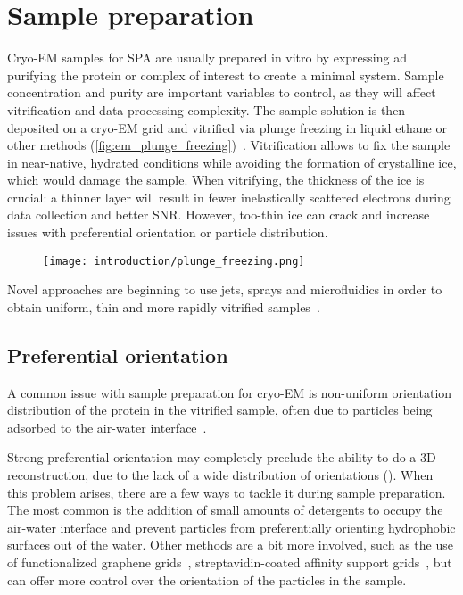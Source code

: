 \section{Sample preparation}
Cryo-EM samples for SPA are usually prepared in vitro by expressing ad purifying the protein or complex of interest to create a minimal system.
Sample concentration and purity are important variables to control, as they will affect vitrification and data processing complexity.
The sample solution is then deposited on a cryo-EM grid and vitrified via plunge freezing in liquid ethane or other methods (\autoref{fig:em_plunge_freezing})~\cite{dubochetCryoelectronMicroscopyVitrified1988}.
Vitrification allows to fix the sample in near-native, hydrated conditions while avoiding the formation of crystalline ice, which would damage the sample.
When vitrifying, the thickness of the ice is crucial: a thinner layer will result in fewer inelastically scattered electrons during data collection and better SNR.
However, too-thin ice can crack and increase issues with preferential orientation or particle distribution.

\begin{figure}[ht]
    \centering
    \texttt{[image: introduction/plunge\_freezing.png]}
    \label{fig:em_plunge_freezing}
\end{figure}

Novel approaches are beginning to use jets, sprays and microfluidics in order to obtain uniform, thin and more rapidly vitrified samples~\cite{geminEasyGridVersatilePlatform2024}.

\subsection{Preferential orientation}\label{em_pref_ori}
A common issue with sample preparation for cryo-EM is non-uniform orientation distribution of the protein in the vitrified sample, often due to particles being adsorbed to the air-water interface~\cite{nobleRoutineSingleParticle2018}.

Strong preferential orientation may completely preclude the ability to do a 3D reconstruction, due to the lack of a wide distribution of orientations ().
When this problem arises, there are a few ways to tackle it during sample preparation.
The most common is the addition of small amounts of detergents to occupy the air-water interface and prevent particles from preferentially orienting hydrophobic surfaces out of the water.
Other methods are a bit more involved, such as the use of functionalized graphene grids~\cite{luFunctionalizedGrapheneGrids2022}, streptavidin-coated affinity support grids~\cite{crucifixImmobilizationBiotinylatedDNA2004,hanLongShelflifeStreptavidin2016}, but can offer more control over the orientation of the particles in the sample.

